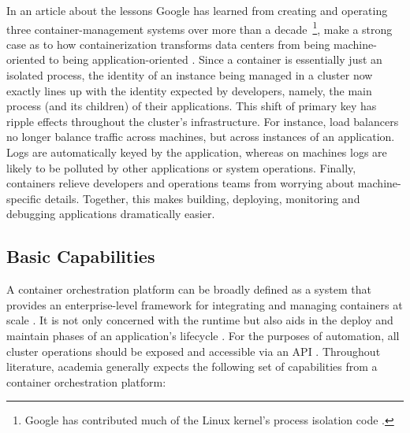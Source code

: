 In an article about the lessons Google has learned from creating and operating three container-management systems over more than a decade~\footnote{Google has contributed much of the Linux kernel's process isolation code \cite[p.~50]{burns2016borg}.}, \citeauthor{burns2016borg} make a strong case as to how containerization transforms data centers from being machine-oriented to being application-oriented \cite[pp.~52--53]{burns2016borg}. Since a container is essentially just an isolated process, the identity of an instance being managed in a cluster now exactly lines up with the identity expected by developers, namely, the main process (and its children) of their applications. This shift of primary key has ripple effects throughout the cluster's infrastructure. For instance, load balancers no longer balance traffic across machines, but across instances of an application. Logs are automatically keyed by the application, whereas on machines logs are likely to be polluted by other applications or system operations. Finally, containers relieve developers and operations teams from worrying about machine-specific details. Together, this makes building, deploying, monitoring and debugging applications dramatically easier.


\subsection{Basic Capabilities}
\label{sec:container-orchestration-platform-capabilities}

A container orchestration platform can be broadly defined as a system that provides an enterprise-level framework for integrating and managing containers at scale \cite[p.~44]{khan2017key}. It is not only concerned with the runtime but also aids in the deploy and maintain phases of an application's lifecycle \cite[p.~225]{casalicchio2019container}. For the purposes of automation, all cluster operations should be exposed and accessible via an \acs{API} \cite[p.~224]{casalicchio2019container} \cite[p.~29]{pahl2015containerization}. Throughout literature, academia generally expects the following set of capabilities from a container orchestration platform:

